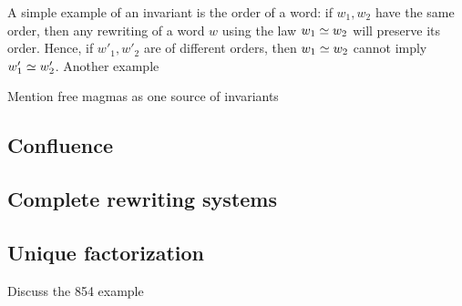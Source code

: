 A simple example of an invariant is the order of a word: if $w_1,w_2$ have the same order, then any rewriting of a word $w$ using the law $w_1 \simeq w_2$ will preserve its order.  Hence, if $w'_1, w'_2$ are of different orders, then $w_1 \simeq w_2$ cannot imply $w'_1 \simeq w'_2$.  Another example




Mention free magmas as one source of invariants

\subsection{Confluence}

\subsection{Complete rewriting systems}

\subsection{Unique factorization}

Discuss the 854 example
